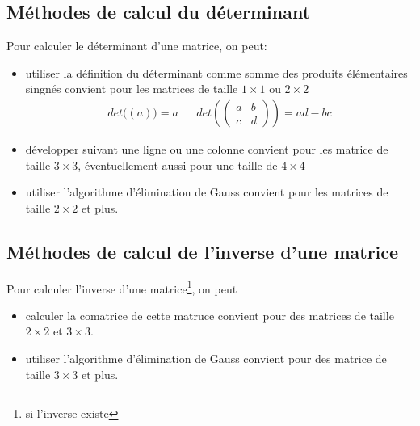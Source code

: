 \subsection{Méthodes de calcul du déterminant}
%
Pour calculer le déterminant d'une matrice, on peut:
\begin{itemize}
  \item utiliser la définition du déterminant comme somme des produits élémentaires singnés convient pour les matrices de taille $1 \times 1$ ou $2 \times 2$
    $$\begin{array}{lcr} det\big((a)\big) = a & & det\left(\begin{pmatrix} a & b \\ c & d \end{pmatrix}\right) = ad - bc \end{array}$$
  \item développer suivant une ligne ou une colonne convient pour les matrice de taille $3 \times 3$, éventuellement aussi pour une taille de $4 \times 4$
  \item utiliser l'algorithme d'élimination de Gauss convient pour les matrices de taille $2 \times 2$ et plus.
\end{itemize}

%
\subsection{Méthodes de calcul de l'inverse d'une matrice}
Pour calculer  l'inverse d'une matrice\footnote{si l'inverse existe}, on peut
\begin{itemize}
  \item calculer la comatrice de cette matruce convient pour des matrices de taille $2 \times 2$ et $3 \times 3$.
  \item utiliser l'algorithme d'élimination de Gauss convient pour des matrice de taille $3 \times 3$ et plus.
\end{itemize}

